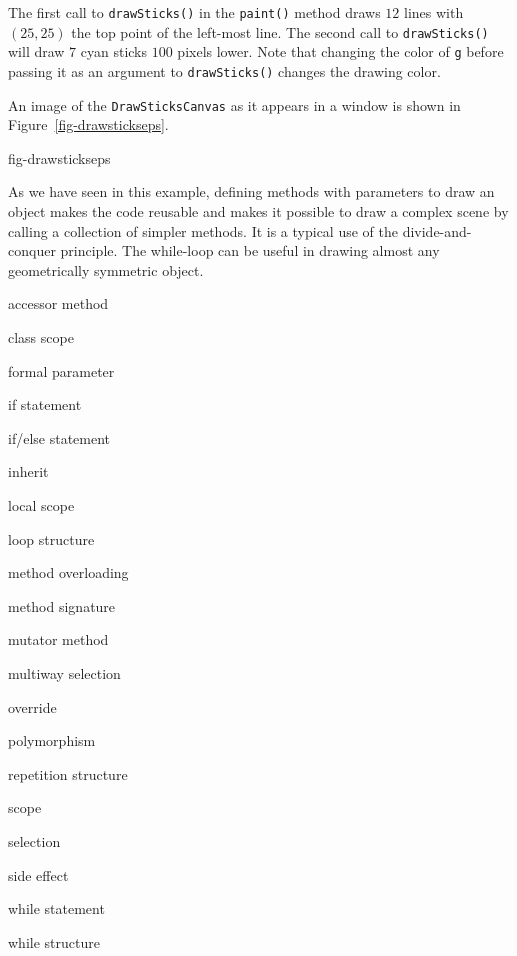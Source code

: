 The first call to {\tt drawSticks()} in the {\tt paint()} method draws $12$
lines with $(25,25)$ the top point of the left-most line.  The second call to
{\tt drawSticks()} will draw $7$ cyan sticks $100$ pixels lower.  Note that 
changing the color of {\tt g} before passing it as an argument to 
{\tt drawSticks()} changes the drawing color.


\noindent An image of the {\tt DrawSticksCanvas} as it appears in a window
is shown in Figure~\ref{fig-drawstickseps}.

{fig-drawstickseps}

As we have seen in this example, defining methods with parameters to
draw an object makes the code reusable and makes it possible to draw a
complex scene by calling a collection of simpler methods.  It is a
typical use of the divide-and-conquer principle.  The while-loop can
be useful in drawing almost any geometrically symmetric object.


\begin{KT}
accessor method

class scope

formal parameter

if statement

if/else statement

inherit

local scope

loop structure

method overloading

method signature

mutator method

multiway selection

override

polymorphism

repetition structure

scope

selection

side effect 

while statement

while structure
\end{KT}

